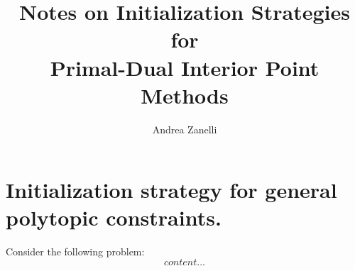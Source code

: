 \documentclass[journal,onecolumn]{IEEEtran}
\begin{document}
	
\title{Notes on Initialization Strategies for \\ Primal-Dual Interior Point Methods}

\author{Andrea Zanelli}

\markboth{}%
{}

\maketitle


\IEEEpeerreviewmaketitle



\section{Initialization strategy for general polytopic constraints.}
Consider the following problem:
\begin{equation}
content...
\end{equation}

\ifCLASSOPTIONcaptionsoff
  \newpage
\fi


\end{document}
